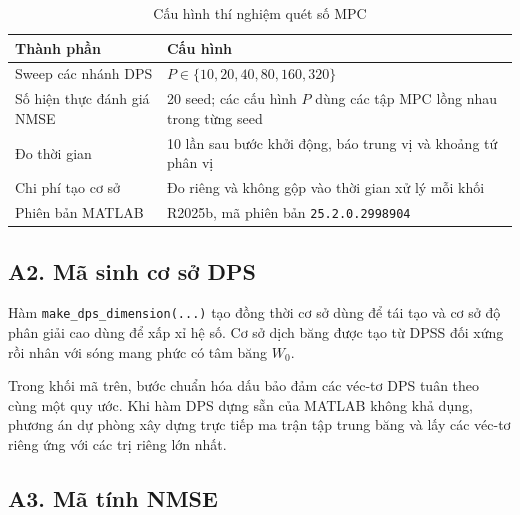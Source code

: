 \begin{table}[H]
    \centering
    \small
    \caption{Cấu hình thí nghiệm quét số MPC}
    \label{tab:app_experiment_parameters}
    \begin{tabularx}{\textwidth}{l X}
        \toprule
        Thành phần & Cấu hình \\
        \midrule
        Sweep các nhánh DPS & \(P\in\{10,20,40,80,160,320\}\) \\
        Số hiện thực đánh giá NMSE & 20 seed; các cấu hình \(P\) dùng các tập MPC lồng nhau trong từng seed \\
        Đo thời gian & 10 lần sau bước khởi động, báo trung vị và khoảng tứ phân vị \\
        Chi phí tạo cơ sở & Đo riêng và không gộp vào thời gian xử lý mỗi khối \\
        Phiên bản MATLAB & R2025b, mã phiên bản \texttt{25.2.0.2998904} \\
        \bottomrule
    \end{tabularx}
\end{table}

\subsection*{A2. Mã sinh cơ sở DPS}
{}
\label{app:dps_code}

Hàm \texttt{make\_dps\_dimension(...)} tạo đồng thời cơ sở dùng để tái tạo và cơ sở độ phân giải cao dùng để xấp xỉ hệ số. Cơ sở dịch băng được tạo từ DPSS đối xứng rồi nhân với sóng mang phức có tâm băng \(W_0\).





Trong khối mã trên, bước chuẩn hóa dấu bảo đảm các véc-tơ DPS tuân theo cùng một quy ước. Khi hàm DPS dựng sẵn của MATLAB không khả dụng, phương án dự phòng xây dựng trực tiếp ma trận tập trung băng và lấy các véc-tơ riêng ứng với các trị riêng lớn nhất.

\subsection*{A3. Mã tính NMSE}
{}
\label{app:nmse_code}

